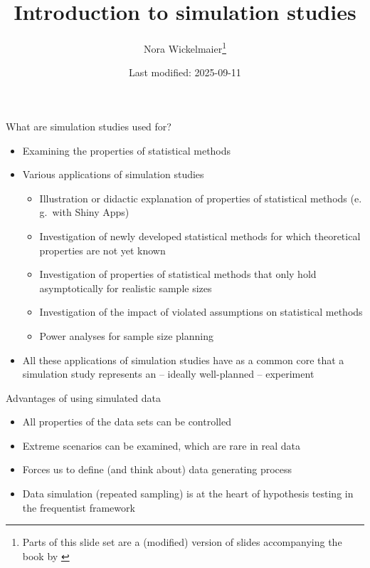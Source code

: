 \documentclass[aspectratio=169]{beamer}
\title{Introduction to simulation studies}
\author{Nora Wickelmaier\footnote{Parts of this slide set are a (modified)
version of slides accompanying the book by \citet{Strobl2024}}}
\date{Last modified: 2025-09-11}
\begin{document}
\begin{frame}{}
\thispagestyle{empty}
\titlepage
\end{frame}


\begin{frame}{What are simulation studies used for?}
  \begin{itemize}
    \item Examining the properties of statistical methods
    \item Various applications of simulation studies
      \begin{itemize}
        \item Illustration or didactic explanation of properties of statistical
          methods (e.\,g.\ with Shiny Apps)
        \item Investigation of newly developed statistical methods for which
          theoretical properties are not yet known
        \item Investigation of properties of statistical methods that only hold
          asymptotically for realistic sample sizes
        \item Investigation of the impact of violated assumptions on statistical
          methods
        \item Power analyses for sample size planning
      \end{itemize}
    \item All these applications of simulation studies have as a common core
      that a simulation study represents an -- ideally well-planned --
      experiment
  \end{itemize}
  \vfill
\end{frame}

\begin{frame}{Advantages of using simulated data}
  \begin{itemize}
    \item All properties of the data sets can be controlled
    \item Extreme scenarios can be examined, which are rare in real data
    \item Forces us to define (and think about) data generating process
    \item Data simulation (repeated sampling) is at the heart of hypothesis
      testing in the frequentist framework
  \end{itemize}
  \vfill
\end{frame}
\end{document}

